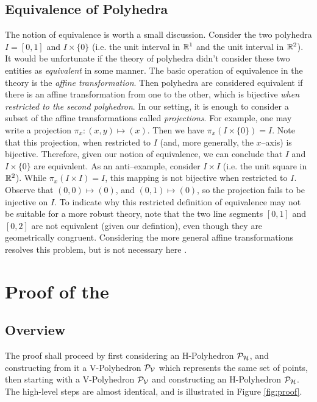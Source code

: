 \documentclass[a4,fleqn]{article}
\begin{document}
\subsection{Equivalence of Polyhedra}  The notion of equivalence is worth a small discussion.  Consider the two polyhedra $I = [0,1]$ and $I\times\{0\}$ (i.e. the unit interval in $\mathbb{R}^1$ and the unit interval in $\mathbb{R}^2$).  It would be unfortunate if the theory of polyhedra didn't consider these two entities as \textit{equivalent} in some manner.  The basic operation of equivalence in the theory is the \textit{affine transformation}.  Then polyhedra are considered equivalent if there is an affine transformation from one to the other, which is bijective \textit{when restricted to the second polyhedron}.  In our setting, it is enough to consider a subset of the affine transformations called \textit{projections}.  For example, one may write a projection $\pi_x: (x,y) \mapsto (x)$.  Then we have $\pi_x (I \times \{0\}) = I$.  Note that this projection, when restricted to $I$ (and, more generally, the $x$--axis) is bijective.  Therefore, given our notion of equivalence, we can conclude that $I$ and $I\times \{0\}$ are equivalent.  As an anti--example, consider $I\times I$ (i.e. the unit square in $\mathbb{R}^2$).  While $\pi_x(I\times I) = I$, this mapping is not bijective when restricted to $I$.  Observe that $(0,0) \mapsto (0)$, and $(0,1) \mapsto (0)$, so the projection fails to be injective on $I$.  To indicate why this restricted definition of equivalence may not be suitable for a more robust theory, note that the two line segments $[0,1]$ and $[0,2]$ are not equivalent (given our defintion), even though they are geometrically congruent.  Considering the more general affine transformations resolves this problem, but is not necessary here .

\section{Proof of the \MWT}

\subsection{Overview}
The proof shall proceed by first considering an H-Polyhedron $\mathcal{P}_{\mathcal{H}}$, and constructing from it a V-Polyhedron $\mathcal{P}_{\mathcal{V}}$ which represents the same set of points, then starting with a V-Polyhedron $\mathcal{P}_{\mathcal{V}}$ and constructing an H-Polyhedron $\mathcal{P}_{\mathcal{H}}$.  The high-level steps are almost identical, and is illustrated in Figure \ref{fig:proof}.
\end{document}

